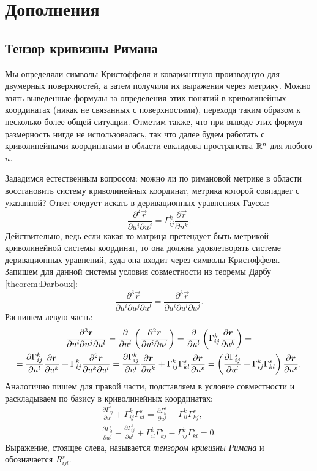 \section{Дополнения}

\subsection{Тензор кривизны Римана}

Мы определяли символы Кристоффеля и ковариантную производную для двумерных поверхностей, а затем получили их выражения через метрику. Можно взять выведенные формулы за определения этих понятий в криволинейных координатах (никак не связанных с поверхностями), переходя таким образом к несколько более общей ситуации. Отметим также, что при выводе этих формул размерность нигде не использовалась, так что далее будем работать с криволинейными координатами в области евклидова пространства $\mathbb{R}^n$ для любого $n$.

Зададимся естественным вопросом: можно ли по римановой метрике в области восстановить систему криволинейных координат, метрика которой совпадает с указанной? Ответ следует искать в деривационных уравнениях Гаусса:
\[
	\frac{\partial^2\vec{r}}{\partial u^i\partial u^j} = \Gamma_{ij}^k\frac{\partial\vec{r}}{\partial u^k}.
\]
Действительно, ведь если какая-то матрица претендует быть метрикой криволинейной системы координат, то она должна удовлетворять системе деривационных уравнений, куда она входит через символы Кристоффеля. Запишем для данной системы условия совместности из теоремы Дарбу \ref{theorem:Darboux}:
\[
	\frac{\partial^3\vec{r}}{\partial u^i\partial u^j\partial u^l} = \frac{\partial^3\vec{r}}{\partial u^i\partial u^l\partial u^j}.
\]
Распишем левую часть:
\begin{multline*}
	\frac{\partial^3\boldsymbol{r}}{\partial u^i\partial u^j\partial u^l} = \frac{\partial}{\partial u^l}\left(\frac{\partial^2\boldsymbol{r}}{\partial u^i\partial u^j}\right) = \frac{\partial}{\partial u^l}\left(\Gamma_{ij}^k\frac{\partial\boldsymbol{r}}{\partial u^k}\right) =\\ = \frac{\partial\Gamma_{ij}^k}{\partial u^l}\frac{\partial\boldsymbol{r}}{\partial u^k} + \Gamma_{ij}^k\frac{\partial^2\boldsymbol{r}}{\partial u^k\partial u^l} = \frac{\partial\Gamma_{ij}^k}{\partial u^l}\frac{\partial\boldsymbol{r}}{\partial u^k} + \Gamma_{ij}^k\Gamma_{kl}^s\frac{\partial\boldsymbol{r}}{\partial u^s} = \left(\frac{\partial\Gamma_{ij}^s}{\partial u^l} + \Gamma_{ij}^k\Gamma_{kl}^s\right)\frac{\partial\boldsymbol{r}}{\partial u^s}.
\end{multline*}
Аналогично пишем для правой части, подставляем в условие совместности и раскладываем по базису в криволинейных координатах:
\begin{gather*}
	\frac{\partial\Gamma_{ij}^s}{\partial u^l} + \Gamma_{ij}^k\Gamma_{kl}^s = \frac{\partial\Gamma_{il}^s}{\partial u^j} + \Gamma_{il}^k\Gamma_{kj}^s,\\
	\frac{\partial\Gamma_{il}^s}{\partial u^j} - \frac{\partial\Gamma_{ij}^s}{\partial u^l} + \Gamma_{il}^k\Gamma_{kj}^s - \Gamma_{ij}^k\Gamma_{kl}^s = 0.
\end{gather*}
Выражение, стоящее слева, называется \textit{тензором кривизны Римана} и обозначается $R^s_{ijl}$.

